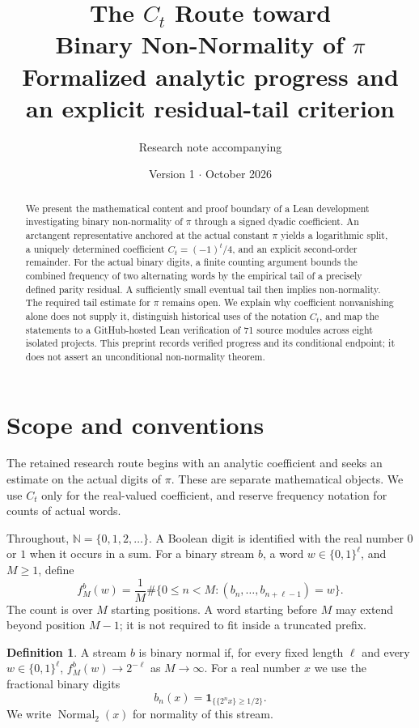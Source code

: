 \documentclass[11pt,a4paper]{article}
\title{\vspace{-12mm}\textbf{The \texorpdfstring{$C_t$}{C_t} Route toward\\Binary Non-Normality of \texorpdfstring{$\pi$}{Pi}}\\[6pt]
  \large Formalized analytic progress and an explicit residual-tail criterion}
\author{\normalsize Research note accompanying \repo}
\date{\normalsize Version 1 \quad$\cdot$\quad 25 October 2026}
\theoremstyle{definition}
\newtheorem{definition}[theorem]{Definition}
\theoremstyle{remark}
\newcommand{\N}{\mathbb N}
\newcommand{\ind}{\mathbf 1}
\newcommand{\Normal}{\operatorname{Normal}_2}
\newcommand{\fracpart}[1]{\{#1\}}
\begin{document}
\maketitle
\thispagestyle{plain}
\begin{abstract}
We present the mathematical content and proof boundary of a Lean development
investigating binary non-normality of $\pi$ through a signed dyadic coefficient.
An arctangent representative anchored at the actual constant $\pi$ yields a
logarithmic split, a uniquely determined coefficient $C_t=(-1)^t/4$, and an
explicit second-order remainder. For the actual binary digits, a finite
counting argument bounds the combined frequency of two alternating words by
the empirical tail of a precisely defined parity residual. A sufficiently
small eventual tail then implies non-normality. The required tail estimate
for $\pi$ remains open. We explain why coefficient nonvanishing alone does
not supply it, distinguish historical uses of the notation $C_t$, and map
the statements to a GitHub-hosted Lean verification of 71 source modules
across eight isolated projects. This preprint records verified progress and
its conditional endpoint; it does not assert an unconditional
non-normality theorem.
\end{abstract}

\section{Scope and conventions}
\label{sec:scope}

The retained research route begins with an analytic coefficient and seeks
an estimate on the actual digits of $\pi$. These are separate mathematical
objects. We use $C_t$ only for the real-valued coefficient, and reserve
frequency notation for counts of actual words.

Throughout, $\N=\{0,1,2,\ldots\}$. A Boolean digit is identified with the
real number $0$ or $1$ when it occurs in a sum. For a binary stream $b$,
a word $w\in\{0,1\}^{\ell}$, and $M\ge1$, define
\begin{equation}
 f_M^b(w)=\frac1M\#\{0\le n<M:
       (b_n,\ldots,b_{n+\ell-1})=w\}.
 \label{eq:frequency}
\end{equation}
The count is over $M$ starting positions. A word starting before $M$
may extend beyond position $M-1$; it is not required to fit inside
a truncated prefix.

\begin{definition}
A stream $b$ is binary normal if, for every fixed length $\ell$ and
every $w\in\{0,1\}^{\ell}$,
$f_M^b(w)\longrightarrow 2^{-\ell}$ as $M\to\infty$.
For a real number $x$ we use the fractional binary digits
\begin{equation}
 b_n(x)=\ind_{\{\fracpart{2^n x}\ge1/2\}}.
 \label{eq:bits}
\end{equation}
We write $\Normal(x)$ for normality of this stream.
\end{definition}
\end{document}
